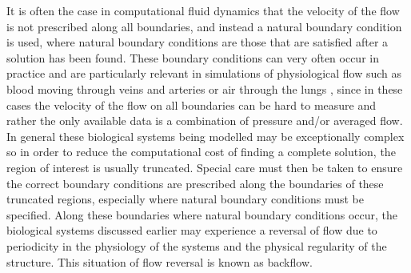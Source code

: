 

It is often the case in computational fluid dynamics that the velocity of the flow is not prescribed along all boundaries, and instead a natural boundary condition is used, where natural boundary conditions are those that are satisfied after a solution has been found. These boundary conditions can very often occur in practice and are particularly relevant in simulations of physiological flow such as blood moving through veins and arteries or air through the lungs \cite{bertoglio2017}, since in these cases the velocity of the flow on all boundaries can be hard to measure and rather the only available data is a combination of pressure and/or averaged flow. In general these biological systems being modelled may be exceptionally complex so in order to reduce the computational cost of finding a complete solution, the region of interest is usually truncated. Special care must then be taken to ensure the correct boundary conditions are prescribed along the boundaries of these truncated regions, especially where natural boundary conditions must be specified. Along these boundaries where natural boundary conditions occur, the biological systems discussed earlier may experience a reversal of flow due to periodicity in the physiology of the systems and the physical regularity of the structure. This situation of flow reversal is known as backflow.



